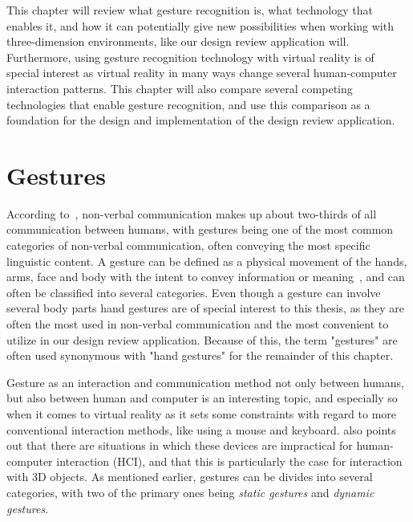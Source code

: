 This chapter will review what gesture recognition is, what technology that enables it, and how it can potentially give new possibilities when working
with three-dimension environments, like our design review application will. Furthermore, using gesture recognition technology with virtual reality is 
of special interest as virtual reality in many ways change several human-computer interaction patterns. This chapter will also compare several competing 
technologies that enable gesture recognition, and use this comparison as a foundation for the design and implementation of the design review application.  

\section{Gestures}
According to~\citet{Hogan2003}, non-verbal communication makes up about two-thirds of all communication between humans, with gestures being one of the most common 
categories of non-verbal communication, often conveying the most specific linguistic content.
A gesture can be defined as a physical movement of the hands, arms, face and body with the intent to convey information or meaning~\citep{Mitra2007}, 
and can often be classified into several categories. Even though 
a gesture can involve several body parts hand gestures are of special interest to this thesis, as they are often the most used in non-verbal communication
and the most convenient to utilize in our design review application. 
Because of this, the term "gestures" are often used synonymous with "hand gestures" for the remainder of this chapter.

Gesture as an interaction and communication method not only between humans, but also between human and computer is an interesting topic, 
and especially so when it comes to virtual reality as it sets some constraints with regard to more conventional interaction methods, like using 
a mouse and keyboard. \citet{Rautaray2015} also points out that there are situations in which
these devices are impractical for human-computer interaction (HCI), and that this is particularly the case for interaction with 3D objects.
As mentioned earlier, gestures can be divides into several categories, with two of the primary ones being \textit{static gestures} and \textit{dynamic gestures}.

